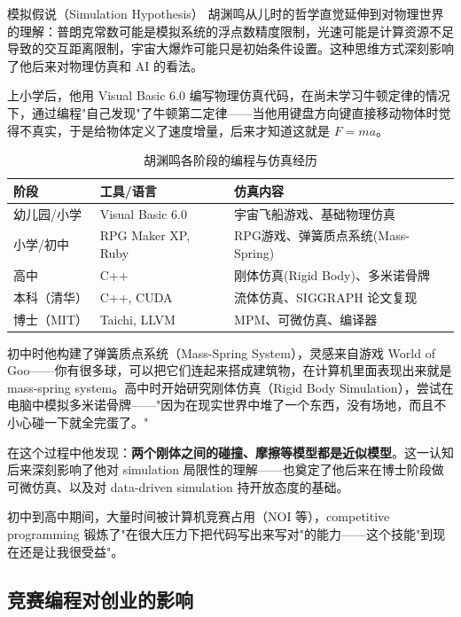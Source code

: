 \documentclass[a4paper]{article}
\begin{document}
\begin{knowledgebox}{模拟假说（Simulation Hypothesis）}
胡渊鸣从儿时的哲学直觉延伸到对物理世界的理解：普朗克常数可能是模拟系统的浮点数精度限制，光速可能是计算资源不足导致的交互距离限制，宇宙大爆炸可能只是初始条件设置。这种思维方式深刻影响了他后来对物理仿真和 AI 的看法。
\end{knowledgebox}

上小学后，他用 Visual Basic 6.0 编写物理仿真代码，在尚未学习牛顿定律的情况下，通过编程"自己发现"了牛顿第二定律——当他用键盘方向键直接移动物体时觉得不真实，于是给物体定义了速度增量，后来才知道这就是 $F = ma$。

\begin{table}[H]
\centering
\caption{胡渊鸣各阶段的编程与仿真经历}
\begin{tabular}{lll}
\toprule
\textbf{阶段} & \textbf{工具/语言} & \textbf{仿真内容} \\
\midrule
幼儿园/小学 & Visual Basic 6.0 & 宇宙飞船游戏、基础物理仿真 \\
小学/初中 & RPG Maker XP, Ruby & RPG游戏、弹簧质点系统(Mass-Spring) \\
高中 & C++ & 刚体仿真(Rigid Body)、多米诺骨牌 \\
本科（清华） & C++, CUDA & 流体仿真、SIGGRAPH 论文复现 \\
博士（MIT） & Taichi, LLVM & MPM、可微仿真、编译器 \\
\bottomrule
\end{tabular}
\end{table}

初中时他构建了弹簧质点系统（Mass-Spring System），灵感来自游戏 World of Goo——你有很多球，可以把它们连起来搭成建筑物，在计算机里面表现出来就是 mass-spring system。高中时开始研究刚体仿真（Rigid Body Simulation），尝试在电脑中模拟多米诺骨牌——"因为在现实世界中堆了一个东西，没有场地，而且不小心碰一下就全完蛋了。"

在这个过程中他发现：\textbf{两个刚体之间的碰撞、摩擦等模型都是近似模型}。这一认知后来深刻影响了他对 simulation 局限性的理解——也奠定了他后来在博士阶段做可微仿真、以及对 data-driven simulation 持开放态度的基础。

初中到高中期间，大量时间被计算机竞赛占用（NOI 等），competitive programming 锻炼了"在很大压力下把代码写出来写对"的能力——这个技能"到现在还是让我很受益"。

\subsection{竞赛编程对创业的影响}
\end{document}
